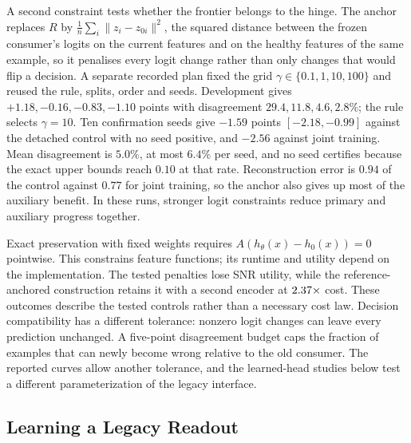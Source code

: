 \documentclass{article}
\begin{document}


A second constraint tests whether the frontier belongs to the hinge. The anchor
replaces $R$ by $\frac1n\sum_i\lVert z_i-z_{0i}\rVert^2$, the squared distance
between the frozen consumer's logits on the current features and on the healthy
features of the same example, so it penalises every logit change rather than
only changes that would flip a decision. A separate recorded plan fixed the
grid $\gamma\in\{0.1,1,10,100\}$ and reused the rule, splits, order and seeds.
Development gives $+1.18,-0.16,-0.83,-1.10$ points with disagreement
$29.4,11.8,4.6,2.8\%$; the rule selects $\gamma=10$. Ten confirmation seeds give
$-1.59$ points $[-2.18,-0.99]$ against the detached control with no seed
positive, and $-2.56$ against joint training. Mean disagreement is $5.0\%$, at
most $6.4\%$ per seed, and no seed certifies because the exact upper bounds reach
$0.10$ at that rate. Reconstruction error is $0.94$ of the control against $0.77$
for joint training, so the anchor also gives up most of the auxiliary benefit.
In these runs, stronger logit constraints reduce primary and auxiliary progress
together.

Exact preservation with fixed weights requires
$A(h_\theta(x)-h_0(x))=0$ pointwise. This constrains feature functions;
its runtime and utility depend on the implementation. The tested penalties
lose SNR utility, while the reference-anchored construction retains it with a
second encoder at $2.37\times$ cost. These outcomes describe
the tested controls rather than a necessary cost law. Decision compatibility
has a different tolerance: nonzero logit changes can leave every prediction
unchanged. A five-point disagreement budget caps the fraction of examples
that can newly become wrong relative to the old consumer. The reported curves
allow another tolerance, and the learned-head studies below test a different
parameterization of the legacy interface.

\subsection{Learning a Legacy Readout}\label{app:protected_head}
\end{document}
